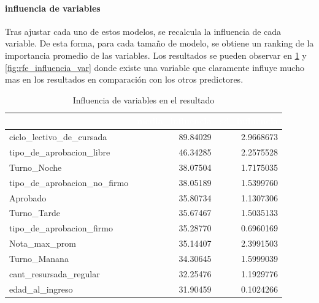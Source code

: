 \paragraph{influencia de variables}
Tras ajustar cada uno de estos modelos, se recalcula la influencia de cada variable. De esta forma, para cada tamaño de modelo, se obtiene un ranking de la importancia promedio de las variables. Los resultados se pueden observar en \ref{tab:tf_rfe_influencia_variables} y \ref{fig:rfe_influencia_var} donde existe una variable que claramente influye mucho mas en los resultados en comparación con los otros predictores.

\begin{table}[!h]
	
	\caption{\label{tab:tf_rfe_influencia_variables}Influencia de variables en el resultado}
	\centering
	\begin{tabular}[t]{lrr}
		\toprule
		\rowcolor{black}  \multicolumn{1}{c}{\textcolor{white}{\textbf{var}}} & \multicolumn{1}{c}{\textcolor{white}{\textbf{media\_influencia}}} & \multicolumn{1}{c}{\textcolor{white}{\textbf{sd\_influencia}}}\\
		\midrule
		\rowcolor{gray!6}  ciclo\_lectivo\_de\_cursada & 89.84029 & 2.9668673\\
		tipo\_de\_aprobacion\_libre & 46.34285 & 2.2575528\\
		\rowcolor{gray!6}  Turno\_Noche & 38.07504 & 1.7175035\\
		tipo\_de\_aprobacion\_no\_firmo & 38.05189 & 1.5399760\\
		\rowcolor{gray!6}  Aprobado & 35.80734 & 1.1307306\\
		\addlinespace
		Turno\_Tarde & 35.67467 & 1.5035133\\
		\rowcolor{gray!6}  tipo\_de\_aprobacion\_firmo & 35.28770 & 0.6960169\\
		Nota\_max\_prom & 35.14407 & 2.3991503\\
		\rowcolor{gray!6}  Turno\_Manana & 34.30645 & 1.5999039\\
		cant\_resursada\_regular & 32.25476 & 1.1929776\\
		\addlinespace
		\rowcolor{gray!6}  edad\_al\_ingreso & 31.90459 & 0.1024266\\
		\bottomrule
	\end{tabular}
\end{table}

